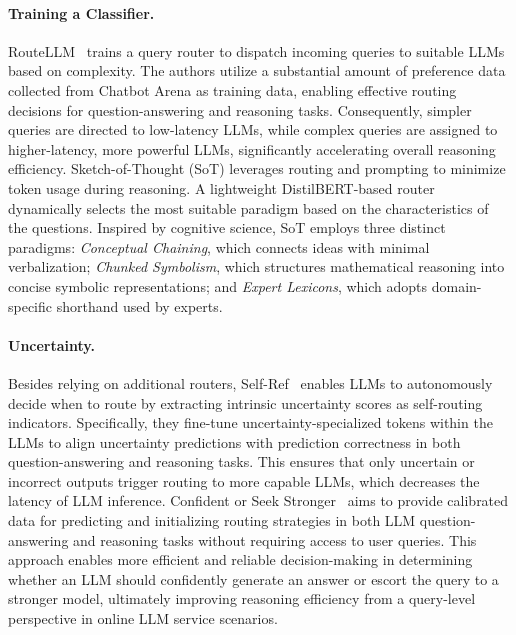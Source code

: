 \paragraph{Training a Classifier.} RouteLLM~\cite{ong2024routellm} trains a query router to dispatch incoming queries to suitable LLMs based on complexity. The authors utilize a substantial amount of preference data collected from Chatbot Arena as training data, enabling effective routing decisions for question-answering and reasoning tasks. Consequently, simpler queries are directed to low-latency LLMs, while complex queries are assigned to higher-latency, more powerful LLMs, significantly accelerating overall reasoning efficiency. Sketch-of-Thought (SoT) \cite{aytes2025sketch} leverages routing and prompting to minimize token usage during reasoning. A lightweight DistilBERT-based router dynamically selects the most suitable paradigm based on the characteristics of the questions. Inspired by cognitive science, SoT employs three distinct paradigms: \textit{Conceptual Chaining}, which connects ideas with minimal verbalization; \textit{Chunked Symbolism}, which structures mathematical reasoning into concise symbolic representations; and \textit{Expert Lexicons}, which adopts domain-specific shorthand used by experts. 

\paragraph{Uncertainty.} Besides relying on additional routers, Self-Ref~\cite{chuang2025learningroutellmsconfidence} enables LLMs to autonomously decide when to route by extracting intrinsic uncertainty scores as self-routing indicators. Specifically, they fine-tune uncertainty-specialized tokens within the LLMs to align uncertainty predictions with prediction correctness in both question-answering and reasoning tasks. This ensures that only uncertain or incorrect outputs trigger routing to more capable LLMs, which decreases the latency of LLM inference. Confident or Seek Stronger~\cite{chuang2025confident} aims to provide calibrated data for predicting and initializing routing strategies in both LLM question-answering and reasoning tasks without requiring access to user queries. This approach enables more efficient and reliable decision-making in determining whether an LLM should confidently generate an answer or escort the query to a stronger model, ultimately improving reasoning efficiency from a query-level perspective in online LLM service scenarios. 



